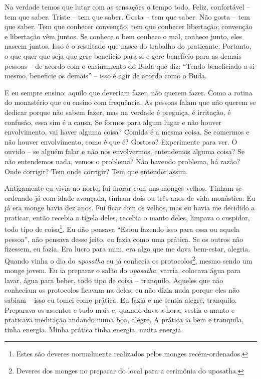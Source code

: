 Na verdade temos que lutar com as sensações o tempo todo. Feliz,
confortável – tem que saber. Triste – tem que saber. Gosta – tem que
saber. Não gosta – tem que saber. Tem que conhecer convenção, tem que
conhecer libertação; convenção e libertação vêm juntos. Se conhece o
bem conhece o mal, conhece junto, eles nascem juntos. Isso é o
resultado que nasce do trabalho do praticante. Portanto, o que quer que
seja que gere benefício para si e gere benefício para as demais pessoas
– de acordo com o ensinamento do Buda que diz: “Tendo beneficiado a si
mesmo, beneficie os demais” – isso é agir de acordo como o Buda. 

E eu sempre ensino: aquilo que deveriam fazer, não querem fazer.
Como a rotina do monastério que eu ensino com frequência. As pessoas
falam que não querem se dedicar porque não sabem fazer, mas na verdade
é preguiça, é irritação, é confusão, essa sim é a causa. Se formos para
algum lugar e não houver envolvimento, vai haver alguma coisa? Comida é
a mesma coisa. Se comermos e não houver envolvimento, como é que é?
Gostoso? Experimente para ver. O ouvido – se alguém falar e não nos
envolvermos, entendemos alguma coisa? Se não entendemos nada, vemos o
problema? Não havendo problema, há razão? Onde corrigir? Tem onde
corrigir? Tem que entender assim. 

Antigamente eu vivia no norte, fui morar com uns monges velhos.
Tinham se ordenado já com idade avançada, tinham dois ou três anos de
vida monástica. Eu já era monge havia dez anos. Fui ficar com os
velhos, mas eu havia me decidido a praticar, então recebia a tigela
deles, recebia o manto deles, limpava o cuspidor, todo tipo de
coisa\footnote{Estes são deveres normalmente realizados pelos monges
recém-ordenados.}. Eu não pensava “Estou fazendo isso para essa ou
aquela pessoa”, não pensava desse jeito, eu fazia como uma prática. Se
os outros não fizessem, eu fazia. Era lucro para mim, era algo que me
dava bem-estar, alegria. Quando vinha o dia do \textit{uposatha} eu já
conhecia os protocolos\footnote{Deveres dos monges no preparar do local
para a cerimônia do uposatha.}, mesmo sendo um monge jovem. Eu ia
preparar o salão do \textit{uposatha}, varria, colocava água para
lavar, água para beber, todo tipo de coisa – tranquilo. Aqueles que não
conheciam os protocolos ficavam na deles; eu não dizia nada porque eles
não sabiam – isso eu tomei como prática. Eu fazia e me sentia alegre,
tranquilo. Preparava os assentos e tudo mais e, quando dava a hora,
vestia o manto e praticava meditação andando numa boa, alegre. A
prática ia bem e tranquila, tinha energia. Minha prática tinha energia,
muita energia. 


